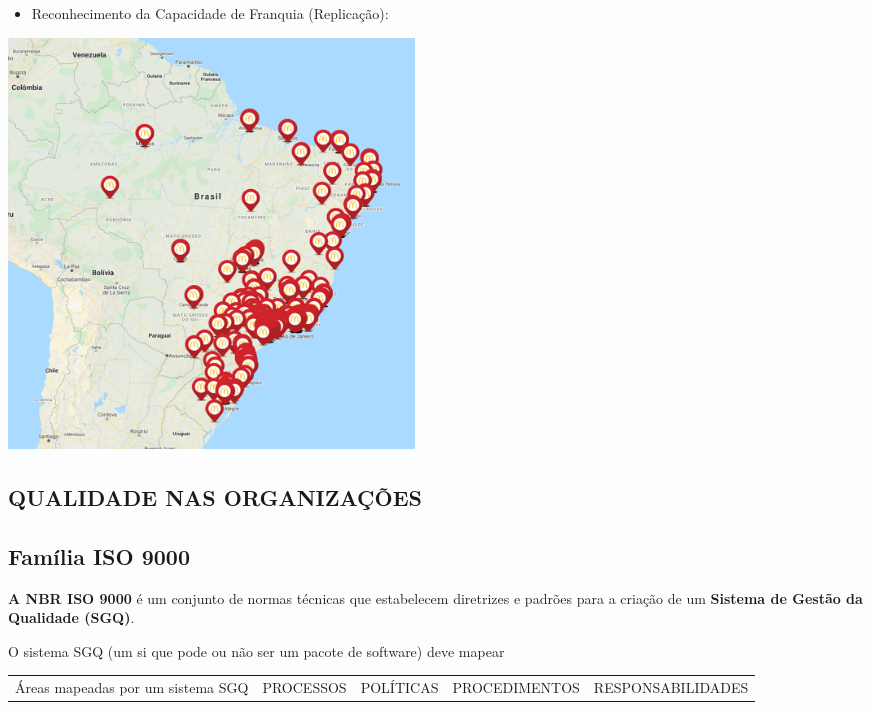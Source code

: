 \documentclass[
]{book}
\providecommand{\tightlist}{%
  \setlength{\itemsep}{0pt}\setlength{\parskip}{0pt}}
\begin{document}
\begin{itemize}
\tightlist
\item
  Reconhecimento da Capacidade de Franquia (Replicação):
\end{itemize}

\includegraphics[width=4.23958in,height=\textheight]{images/mac-donalds/Franquias.jpg}

\subsection{QUALIDADE NAS ORGANIZAÇÕES}\label{qualidade-nas-organizauxe7uxf5es}

\subsection{Família ISO 9000}\label{famuxedlia-iso-9000}

\textbf{A NBR ISO 9000} é um conjunto de normas técnicas que estabelecem diretrizes e padrões para a criação de um \textbf{Sistema de Gestão da Qualidade (SGQ)}.

O sistema SGQ (um si que pode ou não ser um pacote de software) deve mapear

\begin{longtable}[]{@{}
  >{\centering\arraybackslash}p{}
  >{\centering\arraybackslash}p{}
  >{\centering\arraybackslash}p{}
  >{\centering\arraybackslash}p{}
  >{\centering\arraybackslash}p{}@{}}
\toprule\noalign{}
\endhead
\bottomrule\noalign{}
\endlastfoot
Áreas mapeadas por um sistema SGQ & PROCESSOS & POLÍTICAS & PROCEDIMENTOS & RESPONSABILIDADES \\
\end{longtable}
\end{document}
